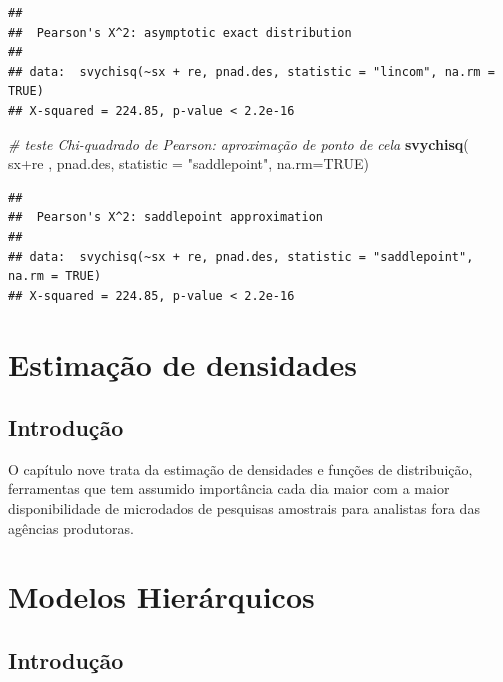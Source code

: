 \documentclass[]{book}
\newenvironment{Shaded}{\begin{snugshade}}{\end{snugshade}}
\newcommand{\KeywordTok}[1]{\textcolor[rgb]{0.13,0.29,0.53}{\textbf{{#1}}}}
\newcommand{\DataTypeTok}[1]{\textcolor[rgb]{0.13,0.29,0.53}{{#1}}}
\newcommand{\StringTok}[1]{\textcolor[rgb]{0.31,0.60,0.02}{{#1}}}
\newcommand{\CommentTok}[1]{\textcolor[rgb]{0.56,0.35,0.01}{\textit{{#1}}}}
\newcommand{\OtherTok}[1]{\textcolor[rgb]{0.56,0.35,0.01}{{#1}}}
\newcommand{\NormalTok}[1]{{#1}}
\numberwithin{example}{chapter}
\numberwithin{remark}{chapter}
\numberwithin{definition}{chapter}
\begin{document}
\begin{verbatim}
## 
##  Pearson's X^2: asymptotic exact distribution
## 
## data:  svychisq(~sx + re, pnad.des, statistic = "lincom", na.rm = TRUE)
## X-squared = 224.85, p-value < 2.2e-16
\end{verbatim}

\begin{Shaded}
\begin{Highlighting}[]
\CommentTok{# teste Chi-quadrado de Pearson: aproximação de ponto de cela}
\KeywordTok{svychisq}\NormalTok{( ~}\StringTok{ }\NormalTok{sx+re , pnad.des, }\DataTypeTok{statistic =} \StringTok{"saddlepoint"}\NormalTok{, }\DataTypeTok{na.rm=}\OtherTok{TRUE}\NormalTok{)}
\end{Highlighting}
\end{Shaded}

\begin{verbatim}
## 
##  Pearson's X^2: saddlepoint approximation
## 
## data:  svychisq(~sx + re, pnad.des, statistic = "saddlepoint", na.rm = TRUE)
## X-squared = 224.85, p-value < 2.2e-16
\end{verbatim}

\chapter{Estimação de densidades}\label{estimacao-de-densidades}

\section{Introdução}\label{introducao-3}

O capítulo nove trata da estimação de densidades e funções de
distribuição, ferramentas que tem assumido importância cada dia maior
com a maior disponibilidade de microdados de pesquisas amostrais para
analistas fora das agências produtoras.

\chapter{Modelos Hierárquicos}\label{modelos-hierarquicos}

\section{Introdução}\label{introducao-4}
\end{document}
